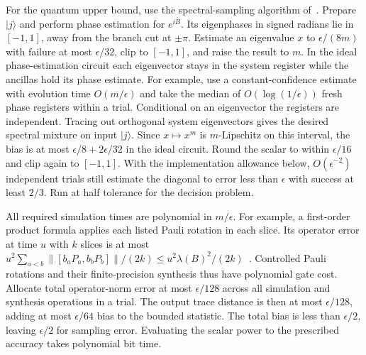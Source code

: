 \documentclass[11pt]{article}
\newcommand{\ket}[1]{\lvert #1\rangle}
\newcommand{\norm}[1]{\lVert #1\rVert}
\begin{document}
For the quantum upper bound, use the spectral-sampling algorithm of~\cite{jw,cif}. Prepare \(\ket j\) and perform phase estimation for \(e^{iB}\). Its eigenphases in signed radians lie in \([-1,1]\), away from the branch cut at \(\pm\pi\). Estimate an eigenvalue \(x\) to \(\epsilon/(8m)\) with failure at most \(\epsilon/32\), clip to \([-1,1]\), and raise the result to \(m\). In the ideal phase-estimation circuit each eigenvector stays in the system register while the ancillas hold its phase estimate. For example, use a constant-confidence estimate with evolution time \(O(m/\epsilon)\) and take the median of \(O(\log(1/\epsilon))\) fresh phase registers within a trial. Conditional on an eigenvector the registers are independent. Tracing out orthogonal system eigenvectors gives the desired spectral mixture on input \(\ket j\). Since \(x\mapsto x^m\) is \(m\)-Lipschitz on this interval, the bias is at most \(\epsilon/8+2\epsilon/32\) in the ideal circuit. Round the scalar to within \(\epsilon/16\) and clip again to \([-1,1]\). With the implementation allowance below, \(O(\epsilon^{-2})\) independent trials still estimate the diagonal to error less than \(\epsilon\) with success at least \(2/3\). Run at half tolerance for the decision problem.

All required simulation times are polynomial in \(m/\epsilon\). For example, a first-order product formula applies each listed Pauli rotation in each slice. Its operator error at time \(u\) with \(k\) slices is at most \(u^2\sum_{a<b}\norm{[b_aP_a,b_bP_b]}/(2k)\le u^2\lambda(B)^2/(2k)\)~\cite{trotter}. Controlled Pauli rotations and their finite-precision synthesis thus have polynomial gate cost. Allocate total operator-norm error at most \(\epsilon/128\) across all simulation and synthesis operations in a trial. The output trace distance is then at most \(\epsilon/128\), adding at most \(\epsilon/64\) bias to the bounded statistic. The total bias is less than \(\epsilon/2\), leaving \(\epsilon/2\) for sampling error. Evaluating the scalar power to the prescribed accuracy takes polynomial bit time.
\end{document}
